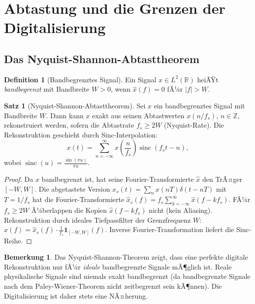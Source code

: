 ﻿\documentclass[a4paper,12pt]{article}
\theoremstyle{definition}
\newtheorem{definition}{Definition}
\newtheorem{satz}{Satz}
\newtheorem{bemerkung}{Bemerkung}
\begin{document}
\section{Abtastung und die Grenzen der Digitalisierung}
\label{sec:abtastung}

\subsection{Das Nyquist-Shannon-Abtasttheorem}

\begin{definition}[Bandbegrenztes Signal]
Ein Signal $x \in L^2(\mathbb{R})$ heiÃŸt \emph{bandbegrenzt} mit Bandbreite
$W > 0$, wenn $\hat{x}(f) = 0$ fÃ¼r $|f| > W$.
\end{definition}

\begin{satz}[Nyquist-Shannon-Abtasttheorem]
\label{satz:nyquist}
Sei $x$ ein bandbegrenztes Signal mit Bandbreite $W$.  Dann kann $x$ exakt aus
seinen Abtastwerten $x(n/f_s)$, $n \in \mathbb{Z}$, rekonstruiert werden,
sofern die Abtastrate $f_s \geq 2W$ (Nyquist-Rate).  Die Rekonstruktion
geschieht durch Sinc-Interpolation:
\[
x(t) = \sum_{n=-\infty}^{\infty} x\!\left(\frac{n}{f_s}\right) \operatorname{sinc}(f_s t - n),
\]
wobei $\operatorname{sinc}(u) = \frac{\sin(\pi u)}{\pi u}$.
\end{satz}

\begin{proof}
Da $x$ bandbegrenzt ist, hat seine Fourier-Transformierte $\hat{x}$ den TrÃ¤ger
$[-W, W]$.  Die abgetastete Version $x_s(t) = \sum_n x(nT)\delta(t-nT)$
mit $T = 1/f_s$ hat die Fourier-Transformierte
$\hat{x}_s(f) = f_s \sum_{k=-\infty}^\infty \hat{x}(f - kf_s)$.
FÃ¼r $f_s \geq 2W$ Ã¼berlappen die Kopien $\hat{x}(f - kf_s)$ nicht (kein Aliasing).
Rekonstruktion durch ideales Tiefpassfilter der Grenzfrequenz $W$:
$\hat{x}(f) = \hat{x}_s(f) \cdot \frac{1}{f_s} \mathbf{1}_{[-W,W]}(f)$.
Inverse Fourier-Transformation liefert die Sinc-Reihe.
\end{proof}

\begin{bemerkung}
Das Nyquist-Shannon-Theorem zeigt, dass eine perfekte digitale Rekonstruktion
nur fÃ¼r \emph{ideale} bandbegrenzte Signale mÃ¶glich ist.  Reale physikalische
Signale sind niemals exakt bandbegrenzt (da bandbegrenzte Signale nach dem
Paley-Wiener-Theorem nicht zeitbegrenzt sein kÃ¶nnen).  Die Digitalisierung ist
daher stets eine NÃ¤herung.
\end{bemerkung}
\end{document}
